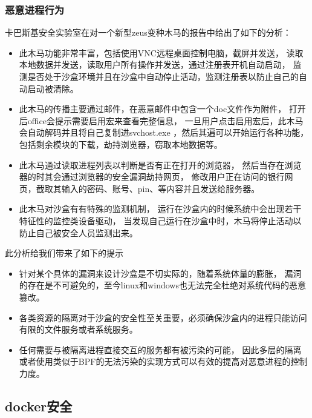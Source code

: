 \documentclass[AutoFakeBold,a4paper]{ctexart}
\begin{document}
\subsubsection{恶意进程行为}

卡巴斯基安全实验室在对一个新型zeus变种木马的报告中给出了如下的分析：\cite{ZeuS2018}

\begin{itemize}
    \item 此木马功能非常丰富，包括使用VNC远程桌面控制电脑，截屏并发送，
    读取本地数据并发送，读取用户所有操作并发送，通过注册表开机自动启动，
    监测是否处于沙盒环境并且在沙盒中自动停止活动，监测注册表以防止自己的自动启动被清除。

    \item 此木马的传播主要通过邮件，在恶意邮件中包含一个doc文件作为附件，
    打开后office会提示需要启用宏来查看完整信息，
    一旦用户点击启用宏后，此木马会自动解码并且将自己复制进svchost.exe
    ，然后其遍可以开始运行各种功能，包括剩余模块的下载，劫持浏览器，窃取本地数据等。
    
    \item 此木马通过读取进程列表以判断是否有正在打开的浏览器，
    然后当存在浏览器的时其会通过浏览器的安全漏洞劫持网页，
    修改用户正在访问的银行网页，截取其输入的密码、账号、pin、等内容并且发送给服务器。
    
    \item 此木马对沙盒有有特殊的监测机制，
    运行在沙盒内的时候系统中会出现若干特征性的监控类设备驱动，
    当发现自己运行在沙盒中时，木马将停止活动以防止自己被安全人员监测出来。
\end{itemize}
此分析给我们带来了如下的提示
\begin{itemize}
    \item 针对某个具体的漏洞来设计沙盒是不切实际的，随着系统体量的膨胀，
    漏洞的存在是不可避免的，至今linux和windows也无法完全杜绝对系统代码的恶意篡改。
    \item 各类资源的隔离对于沙盒的安全性至关重要，必须确保沙盒内的进程只能访问有限的文件服务或者系统服务。
    \item 任何需要与被隔离进程直接交互的服务都有被污染的可能，
    因此多层的隔离或者使用类似于BPF的无法污染的实现方式可以有效的提高对恶意进程的控制力度。
\end{itemize}


\subsection{docker安全}
\end{document}
